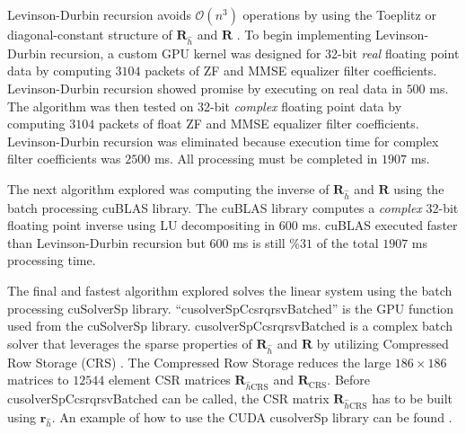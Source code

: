 Levinson-Durbin recursion avoids $\mathcal{O}(n^3)$ operations by using the Toeplitz or diagonal-constant structure of $\mathbf{R}_{\hat{h}}$ and $\mathbf{R}$ \cite[Chap. 5]{hayes:1996}.
To begin implementing Levinson-Durbin recursion, a custom GPU kernel was designed for 32-bit \textit{real} floating point data by computing $3104$ packets of ZF and MMSE equalizer filter coefficients.
Levinson-Durbin recursion showed promise by executing on real data in $500$ ms.
The algorithm was then tested on 32-bit \textit{complex} floating point data by computing $3104$ packets of  float ZF and MMSE equalizer filter coefficients.
Levinson-Durbin recursion was eliminated because execution time for complex filter coefficients was $2500$ ms.
All processing must be completed in $1907$ ms.

The next algorithm explored was computing the inverse of $\mathbf{R}_{\hat{h}}$ and $\mathbf{R}$ using the batch processing cuBLAS library. 
The cuBLAS library computes a \textit{complex} 32-bit floating point inverse using LU decompositing in $600$ ms.
cuBLAS executed faster than Levinson-Durbin recursion but $600$ ms is still $\%31$ of the total $1907$ ms processing time.

The final and fastest algorithm explored solves the linear system using the batch processing cuSolverSp library.
``cusolverSpCcsrqrsvBatched'' is the GPU function used from the cuSolverSp library.
cusolverSpCcsrqrsvBatched is a complex batch solver that leverages the sparse properties of $\mathbf{R}_{\hat{h}}$ and $\mathbf{R}$ by utilizing Compressed Row Storage (CRS) \cite{wiki:Sparse_matrix}.
The Compressed Row Storage reduces the large $186\times186$ matrices to $12544$ element CSR matrices $\mathbf{R}_{\hat{h}\text{CRS}}$ and $\mathbf{R}_{\text{CRS}}$.
Before cusolverSpCcsrqrsvBatched can be called, the CSR matrix $\mathbf{R}_{\hat{h}\text{CRS}}$ has to be built using $\mathbf{r}_{\hat{h}}$.
An example of how to use the CUDA cusolverSp library can be found \cite{CUDA_toolkit_doc}.

